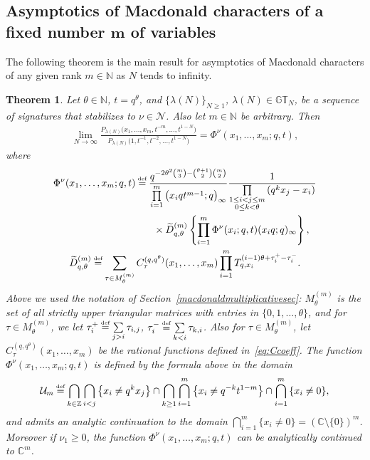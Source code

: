 \documentclass[pdftex]{sigma}
\numberwithin{equation}{section}
\newcommand\myeq{\mathrel{\stackrel{\makebox[0pt]{\mbox{\normalfont\tiny def}}}{=}}}
\newtheorem{thm}{Theorem}[section]
\newcommand{\C}{\mathbb{C}}
\newcommand{\Z}{\mathbb{Z}}
\newcommand{\N}{\mathbb{N}}
\newcommand{\Nu}{\mathcal{N}}
\newcommand{\GT}{\mathbb{GT}}
\begin{document}
\subsection[Asymptotics of Macdonald characters of a f\/ixed number $m$ of variables]{Asymptotics of Macdonald characters of a f\/ixed number $\boldsymbol{m}$ of variables}

The following theorem is the main result for asymptotics of Macdonald characters of any given rank $m\in\N$ as $N$ tends to inf\/inity.

\begin{thm}\label{thm:asymptotics2}
Let $\theta\in\N$, $t = q^{\theta}$, and $\{\lambda(N)\}_{N\geq 1}$, $\lambda(N)\in\GT_N$, be a sequence of signatures that stabilizes to $\nu\in\Nu$. Also let $m\in\N$ be arbitrary. Then
\begin{gather}\label{eqn:asymptotics2}
\lim_{N\rightarrow\infty}{\frac{P_{\lambda(N)}\big(x_1, \dots, x_m, t^{-m}, \dots, t^{1 - N}\big)}{P_{\lambda(N)}\big(1, t^{-1}, t^{-2}, \dots, t^{1 - N}\big)}} = \Phi^{\nu}(x_1, \dots, x_m; q, t),
\end{gather}
where
\begin{gather}
\Phi^{\nu}(x_1, \dots, x_m; q, t) \myeq \frac{q^{-2\theta^2 {m \choose 3} - {\theta+1 \choose 2}{m \choose 2}}}{\prod\limits_{i=1}^m{\big(x_iqt^{m-1}; q\big)_{\infty}}}\frac{1}{\prod\limits_{\substack{1\leq i < j\leq m \\ 0\leq k < \theta}}{(q^kx_j - x_i)}}\nonumber\\
\hphantom{\Phi^{\nu}(x_1, \dots, x_m; q, t) \myeq}{}\times
\widetilde{D}_{q, \theta}^{(m)}\left\{ \prod_{i=1}^m{\Phi^{\nu}(x_i; q, t)(x_iq; q)_{\infty}} \right\},\nonumber\\
\widetilde{D}_{q, \theta}^{(m)} \myeq \sum_{\tau\in M_{\theta}^{(m)}}{C_{\tau}^{(q, q^{\theta})}(x_1, \dots, x_m)\prod_{i=1}^m{T_{q, x_i}^{(i-1)\theta + \tau_i^+ - \tau_i^-}}}.\label{def:Phinu}
\end{gather}
Above we used the notation of Section~{\rm \ref{macdonaldmultiplicativesec}}: $M_{\theta}^{(m)}$ is the set of all strictly upper triangular matrices with entries in $\{0, 1, \dots, \theta\}$, and for $\tau\in M_{\theta}^{(m)}$, we let $\tau_i^+ \myeq \sum\limits_{j > i}{\tau_{i, j}}$, $\tau_i^- \myeq \sum\limits_{k < i}{\tau_{k, i}}$. Also for $\tau\in M_{\theta}^{(m)}$, let $C_{\tau}^{(q, q^{\theta})}(x_1, \dots, x_m)$ be the rational functions defined in~\eqref{eq:Ccoeff}. The function $\Phi^{\nu}(x_1, \dots, x_m; q, t)$ is defined by the formula above in the domain
\begin{gather*}
\mathcal{U}_m \myeq \bigcap_{k\in\Z}{\bigcap_{i<j}\big\{x_i \neq q^kx_j\big\}}\cap\bigcap_{k\geq 1}{\bigcap_{i=1}^m{\big\{x_i \neq q^{-k}t^{1-m}\big\}}}\cap\bigcap_{i=1}^m{\{x_i \neq 0\}},
\end{gather*}
and admits an analytic continuation to the domain $\bigcap\limits_{i=1}^m{\{x_i \neq 0\}}=(\C \setminus \{0\})^m$. Moreover if $\nu_1 \geq 0$, the function $\Phi^{\nu}(x_1, \dots, x_m; q, t)$ can be analytically continued to $\C^m$.


\end{thm}
\end{document}
